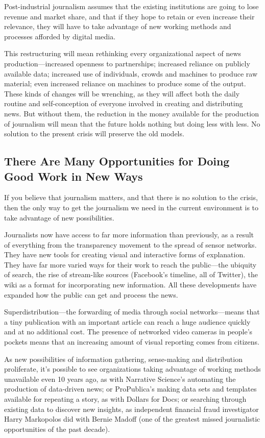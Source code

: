 Post-industrial journalism assumes that the existing institutions are going to lose
revenue and market share, and that if they hope to retain or even increase their
relevance, they will have to take advantage of new working methods and processes
afforded by digital media.

This restructuring will mean rethinking every organizational aspect of news
production—increased openness to partnerships; increased reliance on publicly
available data; increased use of individuals, crowds and machines to produce raw
material; even increased reliance on machines to produce some of the output.
These kinds of changes will be wrenching, as they will affect both the daily routine
and self-conception of everyone involved in creating and distributing news.
But without them, the reduction in the money available for the production of
journalism will mean that the future holds nothing but doing less with less. No
solution to the present crisis will preserve the old models.

\subsection{There Are Many Opportunities for Doing Good Work in New Ways}
If you believe that journalism matters, and that there is no solution to the crisis,
then the only way to get the journalism we need in the current environment is
to take advantage of new possibilities.

Journalists now have access to far more information than previously, as a result
of everything from the transparency movement to the spread of sensor networks.
They have new tools for creating visual and interactive forms of explanation.
They have far more varied ways for their work to reach the public—the ubiquity
of search, the rise of stream-like sources (Facebook’s timeline, all of Twitter), the
wiki as a format for incorporating new information. All these developments have
expanded how the public can get and process the news.

Superdistribution—the forwarding of media through social networks—means
that a tiny publication with an important article can reach a huge audience
quickly and at no additional cost. The presence of networked video cameras
in people’s pockets means that an increasing amount of visual reporting comes
from citizens.

As new possibilities of information gathering, sense-making and distribution
proliferate, it’s possible to see organizations taking advantage of working methods
unavailable even 10 years ago, as with Narrative Science’s automating the
production of data-driven news; or ProPublica’s making data sets and templates
available for repeating a story, as with Dollars for Docs; or searching through
existing data to discover new insights, as independent financial fraud investigator
Harry Markopolos did with Bernie Madoff (one of the greatest missed journalistic
opportunities of the past decade).

